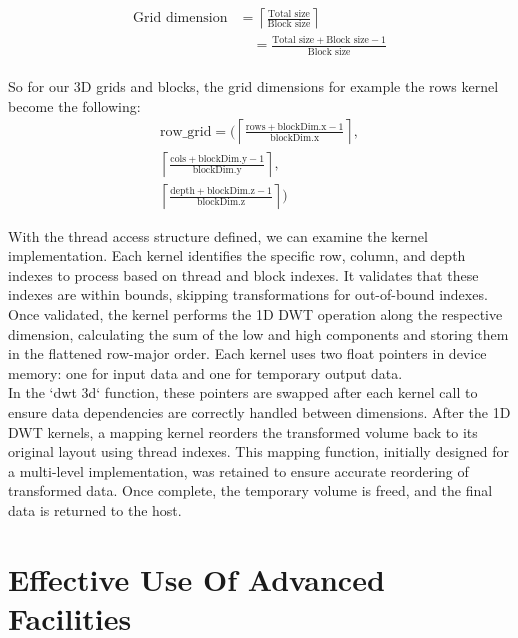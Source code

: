 \documentclass[journal,11pt]{IEEEtran}
\begin{document}
\begin{equation}
    \begin{aligned}
        \text{Grid dimension} &= \left\lceil \frac{\text{Total size}}{\text{Block size}} \right\rceil \\
        &\quad = \frac{\text{Total size} + \text{Block size} - 1}{\text{Block size}}
    \end{aligned}
\end{equation}
\\

So for our 3D grids and blocks, the grid dimensions for example the rows kernel become the following:
\begin{equation}
    \begin{aligned}
        \text{row\_grid} = \Bigg( 
        \left\lceil \frac{\text{rows} + \text{blockDim.x} - 1}{\text{blockDim.x}} \right\rceil, \\
        \left\lceil \frac{\text{cols} + \text{blockDim.y} - 1}{\text{blockDim.y}} \right\rceil, \\
        \left\lceil \frac{\text{depth} + \text{blockDim.z} - 1}{\text{blockDim.z}} \right\rceil
        \Bigg)
    \end{aligned}
\end{equation}
 
With the thread access structure defined, we can examine the kernel implementation. Each kernel identifies the specific row, column, and depth indexes to process based on thread and block indexes. It validates that these indexes are within bounds, skipping transformations for out-of-bound indexes. Once validated, the kernel performs the 1D DWT operation along the respective dimension, calculating the sum of the low and high components and storing them in the flattened row-major order. Each kernel uses two float pointers in device memory: one for input data and one for temporary output data.\\

In the `dwt 3d` function, these pointers are swapped after each kernel call to ensure data dependencies are correctly handled between dimensions. After the 1D DWT kernels, a mapping kernel reorders the transformed volume back to its original layout using thread indexes. This mapping function, initially designed for a multi-level implementation, was retained to ensure accurate reordering of transformed data. Once complete, the temporary volume is freed, and the final data is returned to the host.

\section{Effective Use Of Advanced Facilities}
\end{document}
